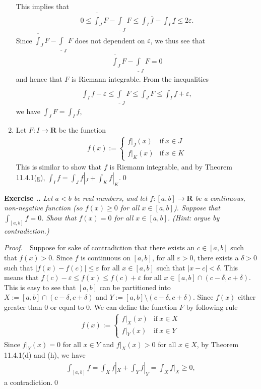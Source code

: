 \documentclass{book}
\newcommand{\pff}{\vspace{.25em}\noindent\emph{Proof.}~~}
\newcounter{Exercise}[section]
\renewcommand{\theExercise}{\thesection.\arabic{Exercise}.}
\newcommand{\new}{\vspace{1.5em}\noindent\textbf{{Exercise \stepcounter{Exercise}\textbf{\theExercise}}} }
\begin{document}
\begin{enumerate}
\begin{align*}
        \end{align*}
    This implies that
        \begin{align*}
            0\leq\overline\int_{J}F-\underline\int_{J}F
            \leq\int_{I}\overline f-\int_{I}\underline f
            \leq 2\varepsilon.
        \end{align*}
    Since $\overline\int_{J}F-\underline\int_{J}F$ does not dependent on $\varepsilon$, we thus see that
        \begin{align*}
            \overline\int_{J}F-\underline\int_{J}F=0
        \end{align*}
    and hence that $F$ is Riemann integrable. From the inequalities
        \begin{align*}
            \int_{I}f-\varepsilon
            \leq\underline\int_{J}F
            \leq\overline\int_{J}F
            \leq\int_{I}f+\varepsilon,
        \end{align*}
    we have $\int_{J}F=\int_{I}f$,
    \item Let $F:I\to\mathbf{R}$ be the function
        \begin{align*}
            f(x):=\left\{\begin{array}{ll}
                f|_J(x) &\text{if}\ x\in J\\
                f|_K(x) &\text{if}\ x\in K
            \end{array}\right.
        \end{align*}
    This is similar to show that $f$ is Riemann integrable, and by Theorem 11.4.1(g), $\int_{I}f=\int_{J}f|_J+\int_{K}f|_K$.\qed
\end{enumerate}

\new\emph{Let $a<b$ be real numbers, and let $f:[a,b]\to\mathbf{R}$ be a continuous, non-negative function (so $f(x)\geq 0$ for all $x\in[a,b]$). Suppose that $\int_{[a,b]}f=0$. Show that $f(x)=0$ for all $x\in[a,b]$. (Hint: argue by contradiction.)}

\pff Suppose for sake of contradiction that there exists an $c\in[a,b]$ such that $f(x)>0$. Since $f$ is continuous on $[a,b]$, for all $\varepsilon>0$, there exists a $\delta>0$ such that $|f(x)-f(c)|\leq\varepsilon$ for all $x\in[a,b]$ such that $|x-c|<\delta$. This means that $f(c)-\varepsilon\leq f(x)\leq f(c)+\varepsilon$ for all $x\in[a,b]\cap(c-\delta,c+\delta)$. This is easy to see that $[a,b]$ can be partitioned into $X:=[a,b]\cap(c-\delta,c+\delta)$ and $Y:=[a,b]\setminus(c-\delta,c+\delta)$. Since $f(x)$ either greater than $0$ or equal to $0$. We can define the function $F$ by following rule
    \begin{align*}
        f(x):=\left\{\begin{array}{ll}
            f|_X(x)&\text{if}\ x\in X\\
            f|_Y(x)   &\text{if}\ x\in Y
        \end{array}\right.
    \end{align*}
Since $f|_Y(x)=0$ for all $x\in Y$ and $f|_X(x)>0$ for all $x\in X$, by Theorem 11.4.1(d) and (h), we have
    \begin{align*}
        \int_{[a,b]}f=\int_{X}f|_X+\int_{Y}f|_Y=\int_{X}f|_X\geq 0,
    \end{align*}
a contradiction.\qed
\end{document}

